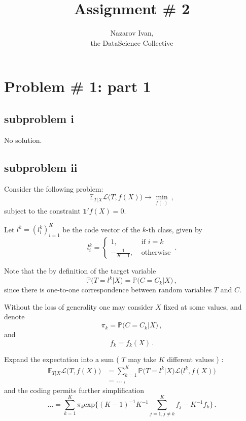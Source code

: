 \documentclass[a4paper]{article}
\title{Assignment \# 2}
\author{Nazarov Ivan, \rus{101мНОД(ИССА)}\\the DataScience Collective}
\newcommand{\pr}{\mathbb{P}}
\newcommand{\ex}{\mathbb{E}}
\newcommand{\Lcal}{\mathcal{L}}
\newcommand{\one}{\mathbf{1}}
\begin{document}
\maketitle

\tableofcontents
\clearpage

\section{Problem \# 1: part 1} %
\label{sec:problem_1}

\subsection{subproblem i} %
\label{sub:subproblem_i}

No solution.

\subsection{subproblem ii} %
\label{sub:subproblem_ii}

Consider the following problem:
\[ \ex_{T|X} \Lcal\bigl( T, f(X)\bigr) \to \min_{f(\cdot)}\,, \]
subject to the constraint $\one'f(X) = 0$.

Let $l^k = (l^k_i)_{i=1}^K$ be the code vector of the $k$-th class, given by
\[ l^k_i = \begin{cases}
	1, &\text{ if } i = k\\
	- \frac{1}{K-1}, &\text{ otherwise}
\end{cases}\,.\]

Note that the by definition of the target variable 
\[
\pr\bigl( T = l^k\big\vert X \bigr)
= \pr\bigl( C = C_k \big\vert X \bigr) \,,
\]
since there is one-to-one correspondence between random variables $T$ and $C$.

Without the loss of generality one may consider $X$ fixed at some values, and denote
\[ \pi_k = \pr\bigl( C = C_k \big\vert X \bigr)\,, \]
and
\[ f_k = f_k(X)\,. \]

Expand the expectation into a sum ( $T$ may take $K$ different values ) :
\begin{align*}
	\ex_{T|X} \Lcal\bigl( T, f(X)\bigr)
	&= \sum_{k=1}^K \pr\bigl( T = l^k \big\vert X \bigr) \Lcal\bigl( l^k, f(X) \bigr)\\
	& = \ldots\,,
\end{align*}
and the coding permits further simplification
\[
\ldots = \sum_{k=1}^K \pi_k \text{exp}\bigl\{ (K-1)^{-1}K^{-1} \sum_{j=1,j\neq k}^K f_j - K^{-1} f_k \bigr\} \,.
\]
\end{document}
